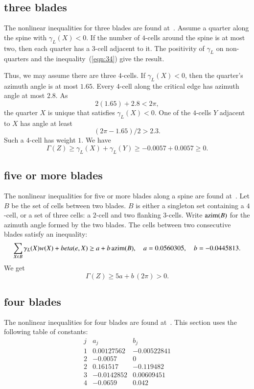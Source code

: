 \subsection{three blades}

The nonlinear inequalities for three blades are found at~\cite[cc:3bl:BIXPCGW]{hales:2009:nonlinear}.  Assume a quarter along the spine with $\gamma_L(X) < 0$.  If the number of $4$-cells around the spine is at most two, then each quarter has a $3$-cell adjacent to it.  The positivity of $\gamma_L$ on non-quarters and the inequality~(\ref{eqn:34}) give the result.  

Thus, we may assume there are three $4$-cells. If $\gamma_L(X)< 0$, then the quarter's azimuth angle is at most $1.65$. Every $4$-cell along the critical edge has azimuth angle at most $2.8$.  As
$$
2 (1.65) + 2.8 < 2 \pi,
$$
the quarter $X$ is unique that satisfies $\gamma_L(X)< 0$.  One of the $4$-cells $Y$ adjacent to $X$ has angle at least 
$$
(2\pi - 1.65)/2 > 2.3.
$$
Such a $4$-cell has weight $1$. We have
$$
\Gamma(Z)\ge \gamma_L(X) + \gamma_L(Y) \ge -0.0057 + 0.0057 \ge0.
$$



\subsection{five or more blades}

The nonlinear inequalities for five or more blades along a spine are found at~\cite[cc:5bl:ZTGIJCF]{hales:2009:nonlinear}.   Let $B$ be the set of cells between two blades.  $B$ is either a singleton set containing a $4$-cell, or a set of three cells: a $2$-cell and two flanking $3$-cells.  Write ${\operatorname{azim}}(B)$ for the azimuth angle formed by the two blades.   The cells between two consecutive blades satisfy an inequality:
$$
\sum_{X\in B} \gamma_L(X)w(X) + beta(e,X) \ge a + b\,{\operatorname{azim}}(B),
\quad a= 0.0560305, \quad b= -0.0445813.
$$
We get
$$
\Gamma(Z) \ge 5 a + b\, (2\pi) > 0.
$$

\subsection{four blades}

The nonlinear inequalities for four blades are found at~\cite[cc:4bl:QITNPEA]{hales:2009:nonlinear}.  This section uses the following table of constants:
\begin{equation}
\begin{matrix}  j&a_j&b_j\\
   1&0.00127562& -0.00522841\\
   2&-0.0057&0\\
   2&0.161517&-0.119482\\
   3&-0.0142852& 0.00609451\\
   4&-0.0659&0.042\\
   \end{matrix}
\end{equation}

